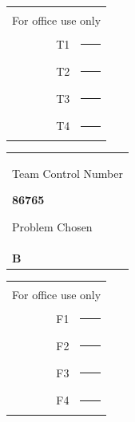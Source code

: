 \documentclass[13pt]{ctexart}
\begin{document}
\thispagestyle{empty}
\begin{table}[h]
	\tabcolsep=2pt 
	\begin{floatrow}
		\begin{minipage}[t]{7.1cm}
			\raggedright
			\renewcommand\arraystretch{1}
			\begin{tabular}[t]{rp{4em}}
				{ }\\[-8pt]
				\multicolumn{2}{l}{For office use only}\\ 
				T1 &  \rule{3cm}{0.15mm}\\ 
				T2 &  \rule{3cm}{0.15mm}\\ 
				T3 &  \rule{3cm}{0.15mm}\\  
				T4 &  \rule{3cm}{0.15mm}\\
			\end{tabular}
		\end{minipage}
		\begin{minipage}[b]{5.4cm}
			\renewcommand\arraystretch{1}
			\begin{tabular}[b]{p{10em}}
				\centering
				{Team Control Number
					
					{\color{red}\fontsize{14pt}{16pt}\selectfont\textbf{{86765}}}
					
					\vspace{14pt}
					
					\normalsize Problem Chosen	
				}\\[10pt]
				{\color{red}\fontsize{24pt}{10pt}\selectfont\textbf{B}}
			\end{tabular}
		\end{minipage}
		\begin{minipage}[t]{5.4cm}
			\raggedleft
			\renewcommand\arraystretch{1}
			\begin{tabular}[t]{rp{4em}}
				{ }\\[-8pt]
				\multicolumn{2}{l}{For office use only} \\
				F1 &  \rule{3cm}{0.15mm}  \\ 
				F2 &  \rule{3cm}{0.15mm}  \\ 
				F3 &  \rule{3cm}{0.15mm}  \\ 
				F4 &  \rule{3cm}{0.15mm}  \\ 
			\end{tabular}
		\end{minipage}
	\end{floatrow}
\end{table}
\vspace{-18pt}
\noindent{\rule{\textwidth}{0.1mm}}
\end{document}
